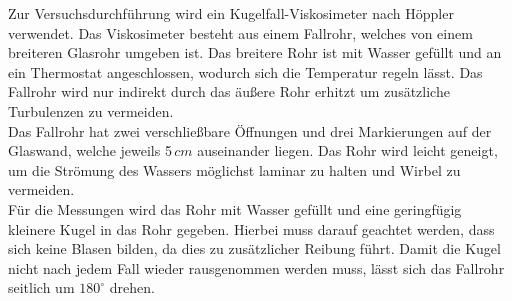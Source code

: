 Zur Versuchsdurchführung wird ein Kugelfall-Viskosimeter nach Höppler verwendet. Das Viskosimeter besteht aus einem Fallrohr, welches von
einem breiteren Glasrohr umgeben ist. Das breitere Rohr ist mit Wasser gefüllt und an ein Thermostat angeschlossen, wodurch sich die Temperatur regeln
lässt. Das Fallrohr wird nur indirekt durch das äußere Rohr erhitzt um zusätzliche Turbulenzen zu vermeiden.\\
Das Fallrohr hat zwei verschließbare Öffnungen und drei Markierungen auf der Glaswand, welche jeweils 5\,$\unit{cm}$ auseinander liegen. Das Rohr wird
leicht geneigt, um die Strömung des Wassers möglichst laminar zu halten und Wirbel zu vermeiden.\\
Für die Messungen wird das Rohr mit Wasser gefüllt und eine geringfügig kleinere Kugel in das Rohr gegeben. Hierbei muss darauf geachtet werden, dass sich keine 
Blasen bilden, da dies zu zusätzlicher Reibung führt. Damit die Kugel nicht nach jedem Fall wieder rausgenommen werden muss, lässt sich das Fallrohr seitlich um 
$\mathrm{180^{\circ}}$ drehen.\\

\newpage